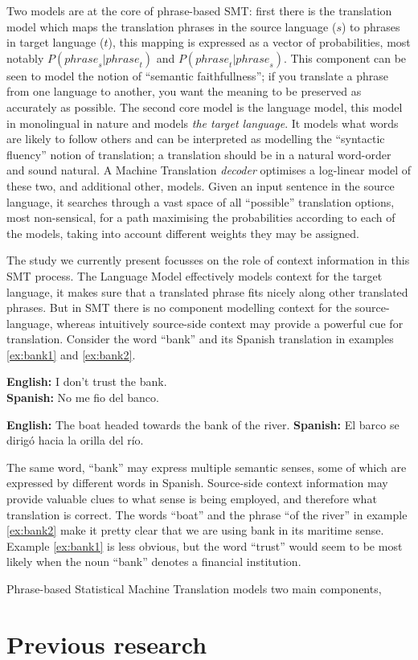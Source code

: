 \documentclass[11pt]{article}
\begin{document}
Two models are at the core of phrase-based SMT: first there is the translation
model which maps the translation phrases in the source language ($s$) to
phrases in target language ($t$), this mapping is expressed as a vector of
probabilities, most notably $P({phrase}_s|{phrase}_t)$ and
$P({phrase}_t|{phrase}_s)$. This component can be seen to model the notion of
``semantic faithfullness''; if you translate a phrase from one language to
another, you want the meaning to be preserved as accurately as possible. The
second core model is the language model, this model in monolingual in nature
and models \emph{the target language}. It models what words are likely to
follow others and can be interpreted as modelling the ``syntactic fluency''
notion of translation; a translation should be in a natural word-order and
sound natural. A Machine Translation \emph{decoder} optimises a log-linear
model of these two, and additional other, models. Given an input sentence in
the source language, it searches through a vast space of all ``possible''
translation options, most non-sensical, for a path maximising the probabilities
according to each of the models, taking into account different weights they may
be assigned.

The study we currently present focusses on the role of context information in
this SMT process. The Language Model effectively models context for the target
language, it makes sure that a translated phrase fits nicely along other
translated phrases. But in SMT there is no component modelling context for the
source-language, whereas intuitively source-side context may provide a powerful
cue for translation. Consider the word ``bank'' and its Spanish translation in
examples \ref{ex:bank1} and \ref{ex:bank2}.

\begin{exe}
\ex \textbf{English:} I don't trust the bank. \\
    \textbf{Spanish:} No me fio del banco.
\label{ex:bank1}

\ex \textbf{English:} The boat headed towards the bank of the river.
    \textbf{Spanish:} El barco se dirigó hacia la orilla del río.
\label{ex:bank2}
\end{exe}

The same word, ``bank'' may express multiple semantic senses, some of which are
expressed by different words in Spanish. Source-side context information may
provide valuable clues to what sense is being employed, and therefore what
translation is correct.  The words ``boat'' and the phrase ``of the river'' in
example \ref{ex:bank2} make it pretty clear that we are using bank in its
maritime sense. Example \ref{ex:bank1} is less obvious, but the word ``trust''
would seem to be most likely when the noun ``bank'' denotes a financial
institution.










Phrase-based Statistical Machine Translation models two main components, 


\section{Previous research}
\end{document}
